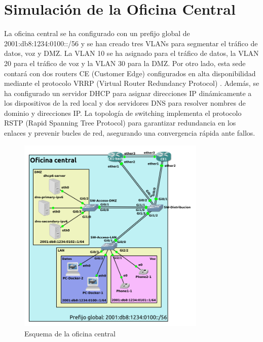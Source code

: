 \section{Simulación de la Oficina Central}
La oficina central se ha configurado con un prefijo global de 2001:db8:1234:0100::/56 y
se han creado tres VLANs para segmentar el tráfico de datos, voz y DMZ. La VLAN
10 se ha asignado para el tráfico de datos, la VLAN 20 para el tráfico de voz y
la VLAN 30 para la DMZ. Por otro lado, esta sede contará con dos routers CE
(Customer Edge) configurados en alta disponibilidad mediante el protocolo VRRP
(Virtual Router Redundancy Protocol) \cite{wikipedia_vrrp}. Además, se ha configurado
un servidor DHCP para asignar direcciones IP dinámicamente a los dispositivos de la red
local y dos servidores DNS para resolver nombres de dominio y direcciones IP. La topología de switching
implementa el protocolo RSTP (Rapid Spanning Tree Protocol) \cite{wikipedia_rstp} para garantizar
redundancia en los enlaces y prevenir bucles de red, asegurando una convergencia
rápida ante fallos.
\begin{figure}[H]
	\centering
	\includegraphics[width=0.8\textwidth]{images/central_office.png}
	\caption{Esquema de la oficina central}
	\label{fig:central_office}
\end{figure}

